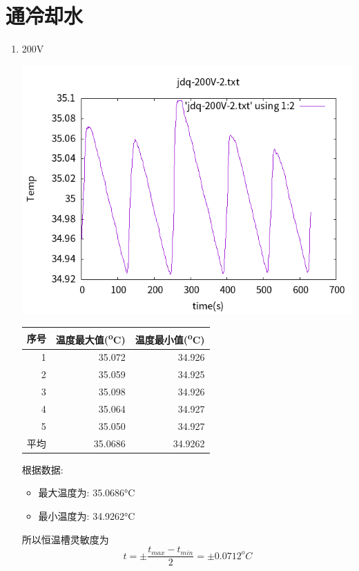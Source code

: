 \documentclass[11pt]{report}
\begin{document}
\section{通冷却水}
\label{sec:org4fcb6c5}
\begin{enumerate}
\item 200V
\label{sec:orga394915}
\begin{center}
\includegraphics[width=.9\linewidth]{../img/jdq-200V-2.txt.png}
\end{center}
\begin{center}
\begin{tabular}{rrr}
序号 & 温度最大值(\textsuperscript{o}C) & 温度最小值(\textsuperscript{o}C)\\
\hline
1 & 35.072 & 34.926\\
2 & 35.059 & 34.925\\
3 & 35.098 & 34.926\\
4 & 35.064 & 34.927\\
5 & 35.050 & 34.927\\
平均 & 35.0686 & 34.9262\\
\end{tabular}
\end{center}

根据数据:
\begin{itemize}
\item 最大温度为: 35.0686°C
\item 最小温度为: 34.9262°C
\end{itemize}
所以恒温槽灵敏度为
\[
t=\pm\frac{t_{max}-t_{min}}{2}=\pm 0.0712^{o}C
\]



\end{enumerate}
\end{document}
